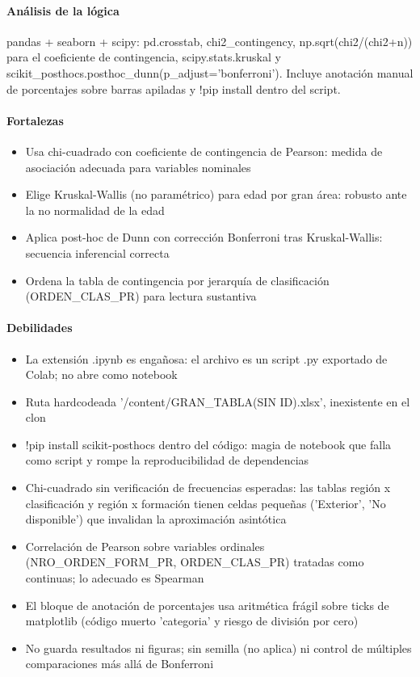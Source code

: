 \paragraph{Análisis de la lógica}
pandas + seaborn + scipy: pd.crosstab, chi2\_contingency, np.sqrt(chi2/(chi2+n)) para el coeficiente de contingencia, scipy.stats.kruskal y scikit\_posthocs.posthoc\_dunn(p\_adjust='bonferroni'). Incluye anotación manual de porcentajes sobre barras apiladas y !pip install dentro del script.

\paragraph{Fortalezas}
\begin{itemize}
  \item Usa chi-cuadrado con coeficiente de contingencia de Pearson: medida de asociación adecuada para variables nominales
  \item Elige Kruskal-Wallis (no paramétrico) para edad por gran área: robusto ante la no normalidad de la edad
  \item Aplica post-hoc de Dunn con corrección Bonferroni tras Kruskal-Wallis: secuencia inferencial correcta
  \item Ordena la tabla de contingencia por jerarquía de clasificación (ORDEN\_CLAS\_PR) para lectura sustantiva
\end{itemize}

\paragraph{Debilidades}
\begin{itemize}
  \item La extensión .ipynb es engañosa: el archivo es un script .py exportado de Colab; no abre como notebook
  \item Ruta hardcodeada '/content/GRAN\_TABLA(SIN ID).xlsx', inexistente en el clon
  \item !pip install scikit-posthocs dentro del código: magia de notebook que falla como script y rompe la reproducibilidad de dependencias
  \item Chi-cuadrado sin verificación de frecuencias esperadas: las tablas región x clasificación y región x formación tienen celdas pequeñas ('Exterior', 'No disponible') que invalidan la aproximación asintótica
  \item Correlación de Pearson sobre variables ordinales (NRO\_ORDEN\_FORM\_PR, ORDEN\_CLAS\_PR) tratadas como continuas; lo adecuado es Spearman
  \item El bloque de anotación de porcentajes usa aritmética frágil sobre ticks de matplotlib (código muerto 'categoria' y riesgo de división por cero)
  \item No guarda resultados ni figuras; sin semilla (no aplica) ni control de múltiples comparaciones más allá de Bonferroni
\end{itemize}

